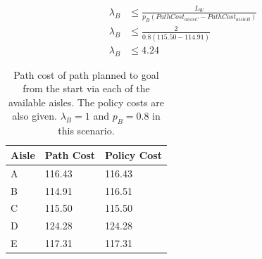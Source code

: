 \documentclass[a4paper,12pt]{article}
\begin{document}
			\begin{equation}
			\begin{split}
				\lambda_B &\leq \frac{L_W}{p_B(PathCost_{aisleC} - PathCost_{aisleB})} \\
				\lambda_B &\leq \frac{2}{0.8(115.50 - 114.91)} \\
				\lambda_B &\leq 4.24
			\end{split}
			\label{eqn:thresholdLambdaAtStart}
			\end{equation}
			
			\begin{table}[H]
				\centering
				\begin{tabular}{@{}l|ll@{}}
					\toprule
					Aisle & Path Cost & Policy Cost \\ \midrule
					A     & 116.43          & 116.43            \\
					B     & 114.91          & 116.51            \\
					C     & 115.50          & 115.50            \\
					D     & 124.28          & 124.28            \\
					E     & 117.31          & 117.31            \\ \bottomrule
				\end{tabular}
				\caption{Path cost of path planned to goal from the start via each of the available aisles. The policy costs are also given. $\lambda_B=1$ and $p_B=0.8$ in this scenario.}
				\label{tab:pathAndPolicyCostSimulations}
			\end{table}
		
	
	\newpage
	
	
	
	
	\newpage
	\appendix
	\appendixpage
	\addappheadtotoc
	
\end{document}
